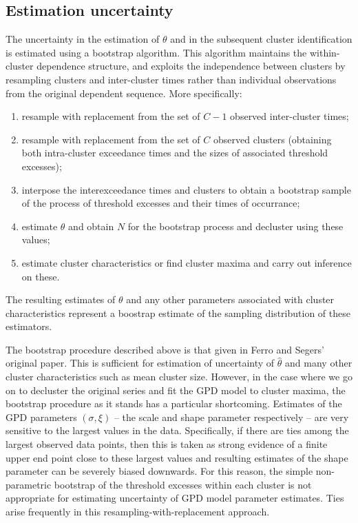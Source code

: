 \documentclass[10pt]{article}\usepackage[]{graphicx}\usepackage[]{color}
\begin{document}
\subsection{Estimation uncertainty}
\label{sect:boot}
%
The uncertainty in the estimation of $\theta$ and in the subsequent cluster identification is estimated using a bootstrap algorithm.  This algorithm maintains the within-cluster dependence structure, and exploits the independence between clusters by resampling clusters and inter-cluster times rather than individual observations from the original dependent sequence.  More specifically:
\begin{enumerate}
\item resample with replacement from the set of $C-1$ observed inter-cluster times;
\item resample with replacement from the set of $C$ observed clusters (obtaining both intra-cluster exceedance times and the sizes of associated threshold excesses);
\item interpose the interexceedance times and clusters to obtain a bootstrap sample of the process of threshold excesses and their times of occurrance;
\item estimate $\theta$ and obtain $N$ for the bootstrap process and decluster using these values;
\item\label{step:findClusterMax} estimate cluster characteristics or find cluster maxima and carry out inference on these.
\end{enumerate}
The resulting estimates of $\theta$ and any other parameters associated with cluster characteristics represent a boostrap estimate of the sampling distribution of these estimators.

The bootstrap procedure described above is that given in Ferro and Segers' original paper.  This is sufficient for estimation of uncertainty of $\hat\theta$ and many other cluster characteristics such as mean cluster size.  However, in the case where we go on to decluster the original series and fit the GPD model to cluster maxima, the bootstrap procedure as it stands has a particular shortcoming.  Estimates of the GPD parameters $(\sigma,\xi)$ -- the scale and shape parameter respectively -- are very sensitive to the largest values in the data.  Specifically, if there are ties among the largest observed data points, then this is taken as strong evidence of a finite upper end point close to these largest values and resulting estimates of the shape parameter can be severely biased downwards.  For this reason, the simple non-parametric bootstrap of the threshold excesses within each cluster is not appropriate for estimating uncertainty of GPD model parameter estimates. Ties arise frequently in this resampling-with-replacement approach.
\end{document}
